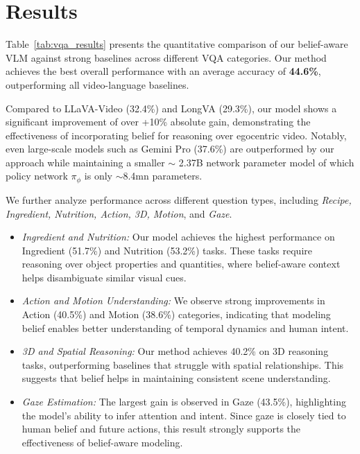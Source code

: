 \documentclass[letterpaper, 10 pt, conference]{ieeeconf}  %
\begin{document}





\section{Results}

Table~\ref{tab:vqa_results} presents the quantitative comparison of our belief-aware VLM against strong baselines across different VQA categories. Our method achieves the best overall performance with an average accuracy of \textbf{44.6\%}, outperforming all video-language baselines.

Compared to LLaVA-Video (32.4\%) and LongVA (29.3\%), our model shows a significant improvement of over +10\% absolute gain, demonstrating the effectiveness of incorporating belief for reasoning over egocentric video. Notably, even large-scale models such as Gemini Pro (37.6\%) are outperformed by our approach while maintaining a smaller $\sim$ 2.37B network parameter model of which policy network $\pi_{\phi}$ is only $\sim$8.4mn parameters. 

\medskip


We further analyze performance across different question types, including \textit{Recipe, Ingredient, Nutrition, Action, 3D, Motion}, and \textit{Gaze}.

\begin{itemize}
    \item \textit{Ingredient and Nutrition:}  
    Our model achieves the highest performance on Ingredient (51.7\%) and Nutrition (53.2\%) tasks. These tasks require reasoning over object properties and quantities, where belief-aware context helps disambiguate similar visual cues.

    \item \textit{Action and Motion Understanding:}  
    We observe strong improvements in Action (40.5\%) and Motion (38.6\%) categories, indicating that modeling belief enables better understanding of temporal dynamics and human intent.

    \item \textit{3D and Spatial Reasoning:}  
    Our method achieves 40.2\% on 3D reasoning tasks, outperforming baselines that struggle with spatial relationships. This suggests that belief helps in maintaining consistent scene understanding.

    \item \textit{Gaze Estimation:}  
    The largest gain is observed in Gaze (43.5\%), highlighting the model’s ability to infer attention and intent. Since gaze is closely tied to human belief and future actions, this result strongly supports the effectiveness of belief-aware modeling.
\end{itemize}
\end{document}
